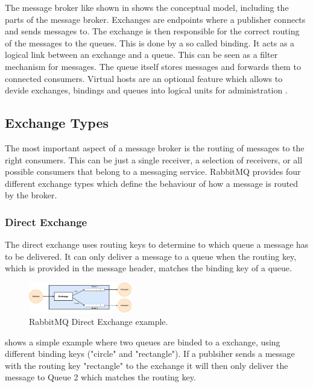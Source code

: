 The message broker like shown in  shows the conceptual model, including the parts of the message broker. Exchanges are endpoints where a publisher connects and sends messages to. The exchange is then responsible for the correct routing of the messages to the queues. This is done by a so called binding. It acts as a logical link between an exchange and a queue. This can be seen as a filter mechanism for messages. The queue itself stores messages and forwards them to connected consumers. Virtual hosts are an optional feature which allows to devide exchanges, bindings and queues into logical units for administration \cite{Toshev2015}.

\subsection{Exchange Types}
The most important aspect of a message broker is the routing of messages to the right consumers. This can be just a single receiver, a selection of receivers, or all possible consumers that belong to a messaging service. RabbitMQ provides four different exchange types which define the behaviour of how a message is routed by the broker.

\subsubsection{Direct Exchange}
The direct exchange uses routing keys to determine to which queue a message has to be delivered. It can only deliver a message to a queue when the routing key, which is provided in the message header, matches the binding key of a queue.
\begin{figure}[ht]
\includegraphics[width=0.4\textwidth]{direct_exchange}
\caption{RabbitMQ Direct Exchange example.}
\label{fig:direct}
\end{figure}
 shows a simple example where two queues are binded to a exchange, using different binding keys ("circle" and "rectangle"). If a publsiher sends a message with the routing key "rectangle" to the exchange it will then only deliver the message to Queue 2 which matches the routing key.

